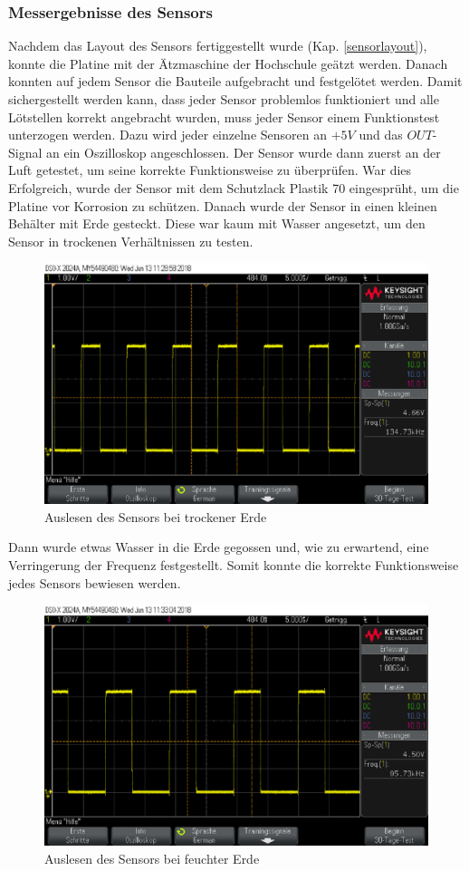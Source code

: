 \subsubsection{Messergebnisse des Sensors}
Nachdem das Layout des Sensors fertiggestellt wurde (Kap. \ref{sensorlayout}), konnte die Platine mit der
Ätzmaschine der Hochschule geätzt werden. Danach konnten auf jedem Sensor die Bauteile
aufgebracht und festgelötet werden. Damit sichergestellt werden kann, dass jeder Sensor
problemlos funktioniert und alle Lötstellen korrekt angebracht wurden, muss jeder Sensor
einem Funktionstest unterzogen werden. Dazu wird jeder einzelne Sensoren an $+5V$ und das
$OUT$-Signal an ein Oszilloskop angeschlossen. Der Sensor wurde dann zuerst an der Luft
getestet, um seine korrekte Funktionsweise zu überprüfen. War dies Erfolgreich, wurde der
Sensor mit dem Schutzlack Plastik 70 eingesprüht, um die Platine vor Korrosion zu schützen.
Danach wurde der Sensor in einen kleinen Behälter mit Erde gesteckt. Diese war kaum mit
Wasser angesetzt, um den Sensor in trockenen Verhältnissen zu testen.
\begin{figure}[ht]
    \includegraphics[width=\textwidth]{dennis/trocken}
    \caption{Auslesen des Sensors bei trockener Erde}
\end{figure}
Dann wurde etwas Wasser in die Erde gegossen und, wie zu erwartend, eine Verringerung der
Frequenz festgestellt.
Somit konnte die korrekte Funktionsweise jedes Sensors bewiesen werden.
\begin{figure}[ht]
    \includegraphics[width=\textwidth]{dennis/feucht}
    \caption{Auslesen des Sensors bei feuchter Erde}
\end{figure}

